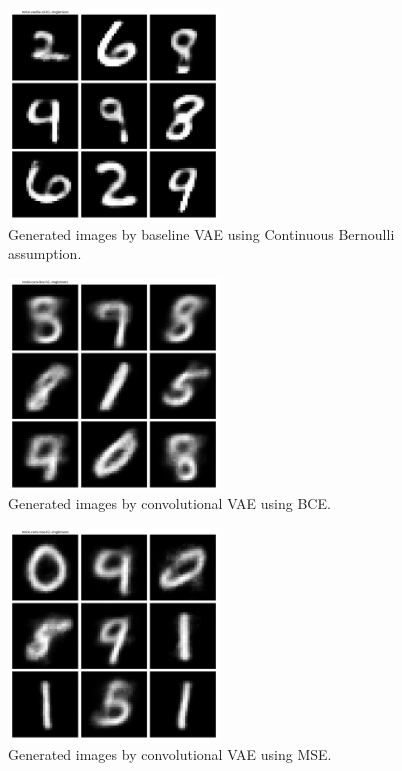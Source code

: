 \begin{appendices}
\begin{figure}[H]
    \centering
    \includegraphics[width=0.5\textwidth]{code/figs/mnist-vanilla-cb-h2--reconstruction.png}
    \caption{Generated images by baseline VAE using Continuous Bernoulli assumption.}
    \label{fig:VAE-CB-images}
\end{figure}

\begin{figure}[H]
    \centering
    \includegraphics[width=0.5\textwidth]{code/figs/mnist-conv-bce-h2--reconstruction.png}
    \caption{Generated images by convolutional VAE using BCE.}
    \label{fig:ConvVAE-BCE-images}
\end{figure}

\begin{figure}[H]
    \centering
    \includegraphics[width=0.5\textwidth]{code/figs/mnist-conv-mse-h2--reconstruction.png}
    \caption{Generated images by convolutional VAE using MSE.}
    \label{fig:ConvVAE-MSE-images}
\end{figure}


\end{appendices}
